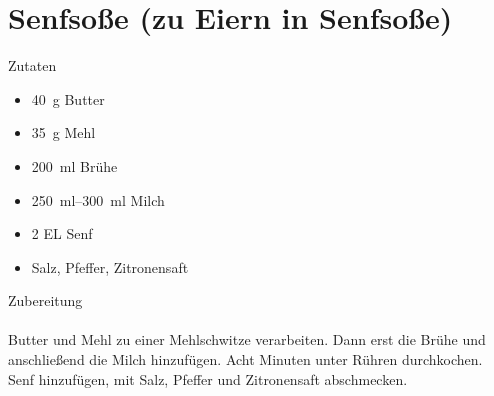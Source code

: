 \section*{Senfsoße (zu Eiern in Senfsoße)}
\ihead{}\ohead{}
\cfoot{}
{\Large Zutaten}
\begin{multicols}{2}
\begin{itemize}
    \item \SI{40}{g} Butter
    \item \SI{35}{g} Mehl
    \item \SI{200}{ml} Brühe
    \item \SIrange{250}{300}{ml} Milch
    \item \num{2} EL Senf
    \item Salz, Pfeffer, Zitronensaft
\end{itemize}
\end{multicols}
\noindent
{\Large Zubereitung}\\
\\
Butter und Mehl zu einer Mehlschwitze verarbeiten.
Dann erst die Brühe und anschließend die Milch hinzufügen. 
Acht Minuten unter Rühren durchkochen. 
Senf hinzufügen, mit Salz, Pfeffer und Zitronensaft abschmecken.